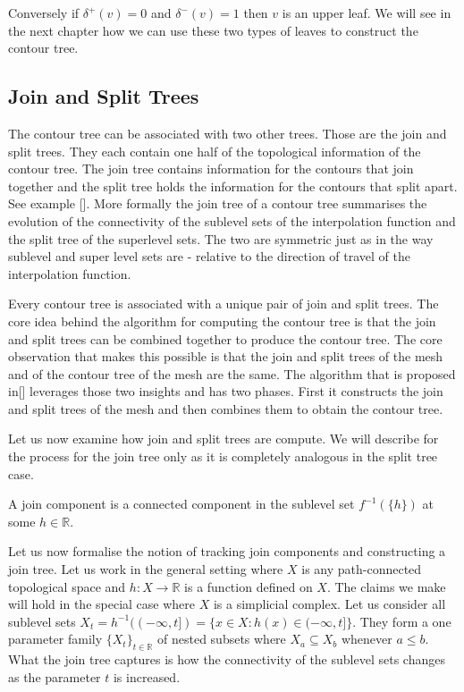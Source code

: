 Conversely if $\delta^+(v) = 0$ and $\delta^-(v) = 1$ then $v$ is an upper leaf. We will see in the next chapter how we can use these two types of leaves to construct the contour tree.

\subsection{Join and Split Trees}

The contour tree can be associated with two other trees. Those are the join and split trees. They each contain one half of the topological information of the contour tree. The join tree contains information for the contours that join together and the split tree holds the information for the contours that split apart. See example []. More formally the join tree of a contour tree summarises the evolution of the connectivity of the sublevel sets of the interpolation function and the split tree of the superlevel sets. The two are symmetric just as in the way sublevel and super level sets are - relative to the direction of travel of the interpolation function.

Every contour tree is associated with a unique pair of join and split trees. The core idea behind the algorithm for computing the contour tree is that the join and split trees can be combined together to produce the contour tree. The core observation that makes this possible is that the join and split trees of the mesh and of the contour tree of the mesh are the same. The algorithm that is proposed in[] leverages those two insights and has two phases. First it constructs the join and split trees of the mesh and then combines them to obtain the contour tree.

Let us now examine how join and split trees are compute. We will describe for the process for the join tree only as it is completely analogous in the split tree case. 

\begin{defn} A join component is a connected component in the sublevel set $f^{-1}(\{h\})$ at some $h \in \mathbb{R}$.  \end{defn}

Let us now formalise the notion of tracking join components and constructing a join tree. Let us work in the general setting where $X$ is any path-connected topological space and $h : X \to \mathbb{R}$ is a function defined on $X$. The claims we make will hold in the special case where $X$ is a simplicial complex. Let us consider all sublevel sets $X_t = h^{-1}((-\infty, t]) = \{x \in X : h(x) \in (-\infty, t] \}$. They form a one parameter family $\{X_t\}_{t \in \mathbb{R}}$ of nested subsets where $X_a \subseteq X_b$ whenever $a \le b$. What the join tree captures is how the connectivity of the sublevel sets changes as the parameter $t$ is increased. 
    
